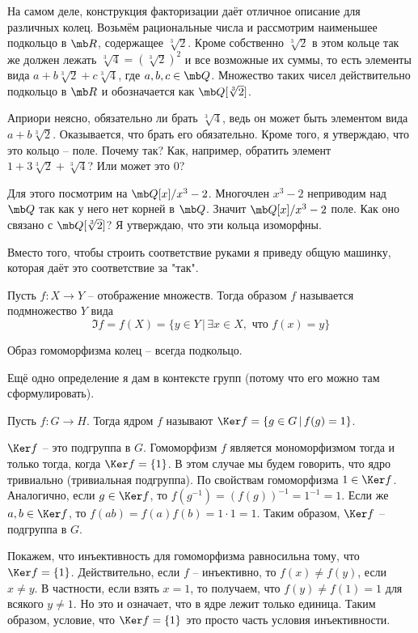 На самом деле, конструкция факторизации даёт отличное описание для различных колец. Возьмём рациональные числа и рассмотрим наименьшее подкольцо в $\mb R$, содержащее $\sqrt[3]{2}$. Кроме собственно $\sqrt[3]{2}$ в этом кольце так же должен лежать $\sqrt[3]{4}=(\sqrt[3]{2})^2$ и все возможные их суммы, то есть элементы вида $a+b\sqrt[3]{2}+c\sqrt[3]{4}$, где $a,b,c \in \mb Q$. Множество таких чисел действительно подкольцо в $\mb R$ и обозначается как $\mb Q[\sqrt[3]{2}]$. 

Априори неясно, обязательно ли  брать $\sqrt[3]{4}$, ведь он может быть элементом вида $a+b\sqrt[3]{2}$. Оказывается, что брать его обязательно. Кроме того, я утверждаю, что  это кольцо --  поле. Почему так? Как, например, обратить элемент $1+3\sqrt[3]{2}+\sqrt[3]{4}$? Или может это 0?

Для этого посмотрим на $\mb Q[x]/x^3-2$. Многочлен $x^3-2$ неприводим над $\mb Q$ так как у него нет корней в $\mb Q$. Значит  $\mb Q[x]/x^3-2$ поле. Как оно связано с $\mb Q[\sqrt[3]{2}]$? Я утверждаю, что эти кольца изоморфны.

Вместо того, чтобы строить соответствие руками я приведу общую машинку, которая даёт это соответствие за "так". 

\dfn Пусть $f\colon X \to Y$ -- отображение множеств. Тогда образом $f$ называется подмножество $Y$ вида
$$\Im f= f(X)=\{y \in Y\, |\, \exists x \in X, \text{ что } f(x)=y\}$$
\edfn

\rm Образ гомоморфизма колец -- всегда подкольцо. 
\erm

Ещё одно определение я дам в контексте групп (потому что его можно там сформулировать).

\dfn Пусть $f\colon G \to H$. Тогда ядром $f$ называют $\Ker f=\{g\in G\,|\, f(g)=1\}$.
\edfn

\lm $\Ker f$ -- это подгруппа в $G$. Гомоморфизм $f$ является мономорфизмом тогда и только тогда, когда $\Ker f=\{1\}$. В этом случае мы будем говорить, что  ядро тривиально (тривиальная подгруппа).
\elm
\proof По свойствам гомоморфизма $1\in \Ker f$. Аналогично, если $g \in \Ker f$, то $f(g^{-1})=(f(g))^{-1}=1^{-1}=1.$ Если же $a,b\in \Ker f$, то $f(ab)=f(a)f(b)=1\cdot 1=1$. Таким образом, $\Ker f $ -- подгруппа в $G$. 

Покажем, что инъективность для гомоморфизма равносильна тому, что $\Ker f=\{1\}$. Действительно, если $f$ -- инъективно, то $f(x)\neq f(y)$, если $x\neq y$. В частности, если взять $x=1$, то получаем, что $f(y)\neq f(1)=1$ для всякого $y\neq 1$. Но это и означает, что  в ядре лежит только единица.  
Таким образом, условие, что $\Ker f=\{1\}$ это просто часть условия инъективности.

